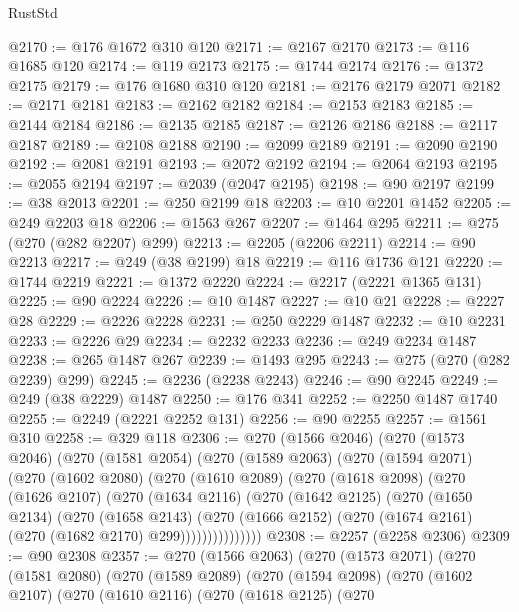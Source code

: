 \begin{lexlean}{RustStd}
\begin{coremodule}
@2170 := @176 @1672 @310 @120
@2171 := @2167 @2170
@2173 := @116 @1685 @120
@2174 := @119 @2173
@2175 := @1744 @2174
@2176 := @1372 @2175
@2179 := @176 @1680 @310 @120
@2181 := @2176 @2179 @2071
@2182 := @2171 @2181
@2183 := @2162 @2182
@2184 := @2153 @2183
@2185 := @2144 @2184
@2186 := @2135 @2185
@2187 := @2126 @2186
@2188 := @2117 @2187
@2189 := @2108 @2188
@2190 := @2099 @2189
@2191 := @2090 @2190
@2192 := @2081 @2191
@2193 := @2072 @2192
@2194 := @2064 @2193
@2195 := @2055 @2194
@2197 := @2039 (@2047 @2195)
@2198 := @90 @2197
@2199 := @38 @2013
@2201 := @250 @2199 @18
@2203 := @10 @2201 @1452
@2205 := @249 @2203 @18
@2206 := @1563 @267
@2207 := @1464 @295
@2211 := @275 (@270 (@282 @2207) @299)
@2213 := @2205 (@2206 @2211)
@2214 := @90 @2213
@2217 := @249 (@38 @2199) @18
@2219 := @116 @1736 @121
@2220 := @1744 @2219
@2221 := @1372 @2220
@2224 := @2217 (@2221 @1365 @131)
@2225 := @90 @2224
@2226 := @10 @1487
@2227 := @10 @21
@2228 := @2227 @28
@2229 := @2226 @2228
@2231 := @250 @2229 @1487
@2232 := @10 @2231
@2233 := @2226 @29
@2234 := @2232 @2233
@2236 := @249 @2234 @1487
@2238 := @265 @1487 @267
@2239 := @1493 @295
@2243 := @275 (@270 (@282 @2239) @299)
@2245 := @2236 (@2238 @2243)
@2246 := @90 @2245
@2249 := @249 (@38 @2229) @1487
@2250 := @176 @341
@2252 := @2250 @1487 @1740
@2255 := @2249 (@2221 @2252 @131)
@2256 := @90 @2255
@2257 := @1561 @310
@2258 := @329 @118
@2306 := @270
    (@1566 @2046)
    (@270
      (@1573 @2046)
      (@270
        (@1581 @2054)
        (@270
          (@1589 @2063)
          (@270
            (@1594 @2071)
            (@270
              (@1602 @2080)
              (@270
                (@1610 @2089)
                (@270
                  (@1618 @2098)
                  (@270
                    (@1626 @2107)
                    (@270
                      (@1634 @2116)
                      (@270
                        (@1642 @2125)
                        (@270
                          (@1650 @2134)
                          (@270
                            (@1658 @2143)
                            (@270
                              (@1666 @2152)
                              (@270 (@1674 @2161) (@270 (@1682 @2170) @299)))))))))))))))
@2308 := @2257 (@2258 @2306)
@2309 := @90 @2308
@2357 := @270
    (@1566 @2063)
    (@270
      (@1573 @2071)
      (@270
        (@1581 @2080)
        (@270
          (@1589 @2089)
          (@270
            (@1594 @2098)
            (@270
              (@1602 @2107)
              (@270
                (@1610 @2116)
                (@270
                  (@1618 @2125)
                  (@270

\end{coremodule}
\end{lexlean}
